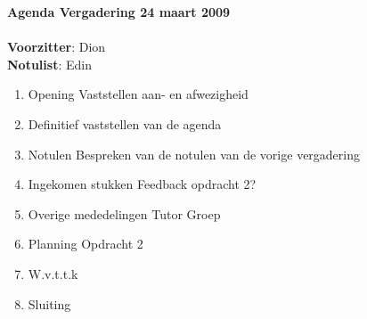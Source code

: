 \documentclass[11pt,oneside,a4paper]{article}
\begin{document}
\textbf{{\LARGE{Agenda Vergadering 24 maart 2009}}}\\ \\
\textbf{Voorzitter}: Dion\\
\textbf{Notulist}: Edin\\
\begin{enumerate}
    \item Opening
        \subitem Vaststellen aan- en afwezigheid
    \item Definitief vaststellen van de agenda
    \item Notulen
        \subitem Bespreken van de notulen van de vorige vergadering
    \item Ingekomen stukken
        \subitem Feedback opdracht 2?
    \item Overige mededelingen
        \subitem Tutor
        \subitem Groep
    \item Planning
            \subitem Opdracht 2
    \item W.v.t.t.k
    \item Sluiting
\end{enumerate}
\end{document}
